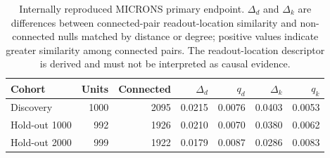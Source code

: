 \begin{table}[t]
\centering
\caption{Internally reproduced MICRONS primary endpoint. $\Delta_d$ and $\Delta_k$ are differences between connected-pair readout-location similarity and non-connected nulls matched by distance or degree; positive values indicate greater similarity among connected pairs. The readout-location descriptor is derived and must not be interpreted as causal evidence.}
\label{tab:microns-primary}
\small
\begin{tabular}{lrrrrrr}
\toprule
Cohort & Units & Connected & $\Delta_d$ & $q_d$ & $\Delta_k$ & $q_k$ \\
\midrule
Discovery & 1000 & 2095 & 0.0215 & 0.0076 & 0.0403 & 0.0053 \\
Hold-out 1000 & 992 & 1926 & 0.0210 & 0.0070 & 0.0380 & 0.0062 \\
Hold-out 2000 & 999 & 1922 & 0.0179 & 0.0087 & 0.0286 & 0.0083 \\
\bottomrule
\end{tabular}
\end{table}
